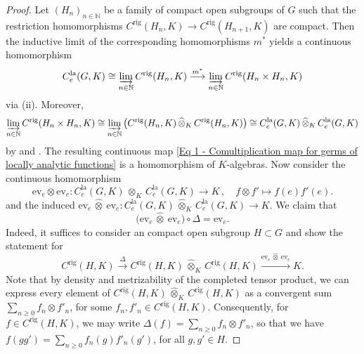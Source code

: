 \documentclass[a4paper, reqno, 10pt]{amsart}
\theoremstyle{definition}
\numberwithin{equation}{section}
\newcommand{\botimes}[1]{{\,\otimes_{#1}\,}}
\newcommand{\cotimes}[1]{{\,\widehat{\otimes}_{#1}\,}}
\newcommand{\la}{{\mathrm{la}}}
\newcommand{\lra}{\longrightarrow}
\newcommand{\lto}{\longmapsto}
\newcommand{\ra}{\rightarrow}
\newcommand{\BN}{{\mathbb {N}}}
\newcommand{\aan}{{\mathrm{rig}}}
\begin{document}
\begin{proof}
	Let $(H_n)_{n\in \BN}$ be a family of compact open subgroups of $G$ such that the restriction homomorphisms $C^\aan (H_n,K)\ra C^\aan(H_{n+1},K)$ are compact.
	Then the inductive limit of the corresponding homomorphisms $m^\ast$ yields a continuous homomorphism
	\begin{equation*}
		C^\la_e(G,K) \cong \varinjlim_{n\in \BN} C^\aan (H_n,K) \overset{m^\ast}{\lra} \varinjlim_{n\in \BN} C^\aan(H_n \times H_n, K) 
	\end{equation*}
	via  (ii).
	Moreover, 
	\begin{equation*}
		\varinjlim_{n \in \BN} C^\aan(H_n\times H_n, K) \cong \varinjlim_{n\in \BN} \big( C^\aan(H_n,K) \cotimes{K} C^\aan(H_n,K) \big) \cong C^\la_e(G,K) \cotimes{K} C^\la_e(G,K)
	\end{equation*}
	by \cite[Expl.\ after Prop.\ 17.10]{Schneider02NonArchFunctAna} and \cite[Prop.\ 1.1.32 (i)]{Emerton17LocAnVect}.
	The resulting continuous map \eqref{Eq 1 - Comultiplication map for germs of locally analytic functions} is a homomorphism of $K$-algebras.
	Now consider the continuous homomorphism
	\begin{equation*}
		\mathrm{ev}_e \otimes \mathrm{ev}_e \colon C^\la_e(G,K) \botimes{K} C^\la_e(G,K) \lra K \,,\quad f \otimes f' \lto f(e) f'(e).
	\end{equation*}
	and the induced $\mathrm{ev}_e \cotimes{} \mathrm{ev}_e \colon C^\la_e(G,K) \cotimes{K} C^\la_e(G,K) \ra K$.
	We claim that 
	\begin{equation}\label{Eq 1 - Equation for comultiplication}
		\big(\mathrm{ev}_e \cotimes{} \mathrm{ev}_e \big) \circ \Delta = \mathrm{ev}_e .
	\end{equation}
	Indeed, it suffices to consider an compact open subgroup $H\subset G$ and show the statement for
	\begin{equation*}
		C^\aan(H,K) \overset{\Delta}{\lra} C^\aan(H,K) \cotimes{K} C^\aan(H,K) \xrightarrow{\mathrm{ev}_e \cotimes{} \mathrm{ev}_e} K.
	\end{equation*}
	Note that by density and metrizability of the completed tensor product, we can express every element of $C^\aan (H,K) \cotimes{K} C^\aan (H,K)$ as a convergent sum $\sum_{n\geq 0} f_n \otimes f'_n$, for some $f_n,f'_n \in C^\aan(H,K)$.
	Consequently, for $f\in C^\aan(H,K)$, we may write $\Delta(f) = \sum_{n\geq 0} f_n \otimes f'_n$, so that we have $f(gg')= \sum_{n\geq 0} f_n(g)f'_n(g')$, for all $g,g'\in H$.

\end{proof}
\end{document}
